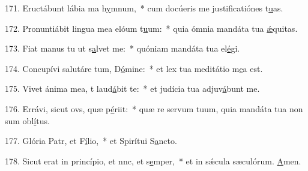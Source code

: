 171. Eructábunt lábia ma h\uline{y}mnum,~* cum docúeris me justificatiónes t\uline{u}as.\par 
172. Pronuntiábit lingua mea elóum t\uline{u}um:~* quia ómnia mandáta tua \uline{ǽ}quitas.\par 
173. Fiat manus tu ut s\uline{a}lvet me:~* quóniam mandáta tua el\uline{é}gi.\par 
174. Concupívi salutáre tum, D\uline{ó}mine:~* et lex tua meditátio m\uline{e}a est.\par 
175. Vivet ánima mea, t laud\uline{á}bit te:~* et judícia tua adjuv\uline{á}bunt me.\par 
176. Errávi, sicut ovs, quæ p\uline{é}riit:~* quæ re servum tuum, quia mandáta tua non sum obl\uline{í}tus.\par 
177. Glória Patr, et F\uline{í}lio,~* et Spirítui S\uline{a}ncto.\par 
178. Sicut erat in princípio, et nnc, et s\uline{e}mper,~* et in sǽcula sæculórum. \uline{A}men.\par 
